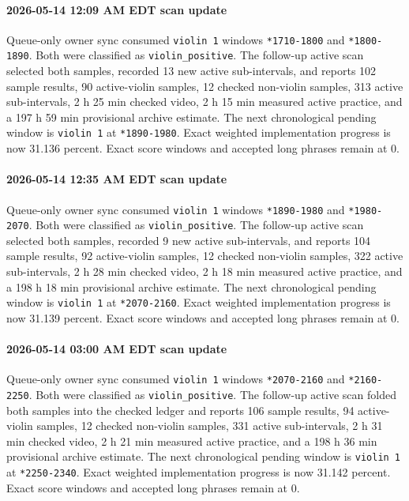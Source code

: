 \paragraph{2026-05-14 12:09 AM EDT scan update} Queue-only owner sync consumed \texttt{violin 1} windows \texttt{*1710-1800} and \texttt{*1800-1890}. Both were classified as \texttt{violin\_positive}. The follow-up active scan selected both samples, recorded 13 new active sub-intervals, and reports 102 sample results, 90 active-violin samples, 12 checked non-violin samples, 313 active sub-intervals, 2 h 25 min checked video, 2 h 15 min measured active practice, and a 197 h 59 min provisional archive estimate. The next chronological pending window is \texttt{violin 1} at \texttt{*1890-1980}. Exact weighted implementation progress is now 31.136 percent. Exact score windows and accepted long phrases remain at 0.
\paragraph{2026-05-14 12:35 AM EDT scan update} Queue-only owner sync consumed \texttt{violin 1} windows \texttt{*1890-1980} and \texttt{*1980-2070}. Both were classified as \texttt{violin\_positive}. The follow-up active scan selected both samples, recorded 9 new active sub-intervals, and reports 104 sample results, 92 active-violin samples, 12 checked non-violin samples, 322 active sub-intervals, 2 h 28 min checked video, 2 h 18 min measured active practice, and a 198 h 18 min provisional archive estimate. The next chronological pending window is \texttt{violin 1} at \texttt{*2070-2160}. Exact weighted implementation progress is now 31.139 percent. Exact score windows and accepted long phrases remain at 0.
\paragraph{2026-05-14 03:00 AM EDT scan update} Queue-only owner sync consumed \texttt{violin 1} windows \texttt{*2070-2160} and \texttt{*2160-2250}. Both were classified as \texttt{violin\_positive}. The follow-up active scan folded both samples into the checked ledger and reports 106 sample results, 94 active-violin samples, 12 checked non-violin samples, 331 active sub-intervals, 2 h 31 min checked video, 2 h 21 min measured active practice, and a 198 h 36 min provisional archive estimate. The next chronological pending window is \texttt{violin 1} at \texttt{*2250-2340}. Exact weighted implementation progress is now 31.142 percent. Exact score windows and accepted long phrases remain at 0.
